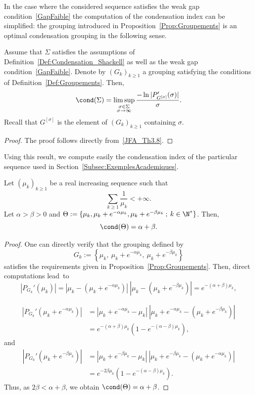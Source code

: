 In the case where the considered sequence satisfies the weak gap condition~\eqref{GapFaible} the computation of the condensation index can be simplified: the grouping introduced in Proposition~\ref{Prop:Groupements} is an optimal condensation grouping in the following sense.

\begin{prop}\label{Prop:CondensationGapParBloc}
Assume that $\Sigma$ satisfies the assumptions of Definition~\ref{Def:Condensation_Shackell} as well as the weak gap condition~\eqref{GapFaible}. Denote by $(G_k)_{k \geq 1}$ a grouping satisfying the conditions of Definition~\ref{Def:Groupements}. Then,
\[
\cond(\Sigma) = \limsup_{\substack{\sigma \in \Sigma \\ \sigma \to \infty}} \frac{- \ln |P_{G^{[\sigma]}}'(\sigma)| }{\sigma}.
\]
Recall that $G^{[\sigma]}$ is the element of $(G_k)_{k \geq 1}$ containing $\sigma$.
\end{prop}


\begin{proof}
The proof follows directly from~\eqref{JFA_Th3.8}.
\end{proof}


Using this result, we compute easily the condensation index of the particular sequence used in Section~\ref{Subsec:ExemplesAcademiques}.
\begin{prop}
Let $(\mu_k)_{k \geq 1}$ be a real increasing sequence such that
\[
\sum_{k \geq 1} \frac{1}{\mu_k} < + \infty.
\]
Let $\alpha >\beta >0$ and $\Theta := \{ \mu_k, \mu_k + e^{-\alpha \mu_k}, \mu_k + e^{-\beta \mu_k} \: ; \: k \in \N^* \}$. Then,
\[
\cond(\Theta) = \alpha + \beta.
\]
\end{prop}

\begin{proof}
One can directly verify that the grouping defined by
\[
G_k := \left\{ \mu_k, \: \mu_k + e^{-\alpha \mu_k}, \: \mu_k + e^{-\beta \mu_k} \right\}
\]
satisfies the requirements given in Proposition~\ref{Prop:Groupements}. Then, direct computations lead~to
\[
\left|P_{G_k}'(\mu_k)\right| = \left|\mu_k - \left(\mu_k + e^{-\alpha \mu_k}\right)\right| \: \left| \mu_k - \left(\mu_k + e^{-\beta \mu_k}\right)\right| = e^{-(\alpha+\beta) \mu_k},
\]


\begin{align*}
\left|P_{G_k}'\left(\mu_k+ e^{-\alpha \mu_k}\right)\right| &= \left|\mu_k+ e^{-\alpha \mu_k}- \mu_k\right| \: \left| \mu_k+ e^{-\alpha \mu_k} - \left(\mu_k + e^{-\beta \mu_k}\right)\right|
\\
&= e^{-(\alpha+\beta) \mu_k} \left(1 - e^{-(\alpha-\beta)\mu_k} \right),
\end{align*}
and
\begin{align*}
\left|P_{G_k}'\left(\mu_k+ e^{-\beta \mu_k}\right)\right| &= \left|\mu_k+ e^{-\beta \mu_k}- \mu_k\right| \: \left| \mu_k+ e^{-\beta \mu_k} - \left(\mu_k + e^{-\alpha \mu_k}\right)\right|
\\
&= e^{-2\beta \mu_k} \left(1 - e^{-(\alpha-\beta)\mu_k} \right).
\end{align*}
Thus, as $2 \beta < \alpha+ \beta$, we obtain $\cond(\Theta) = \alpha + \beta$.
\end{proof}



